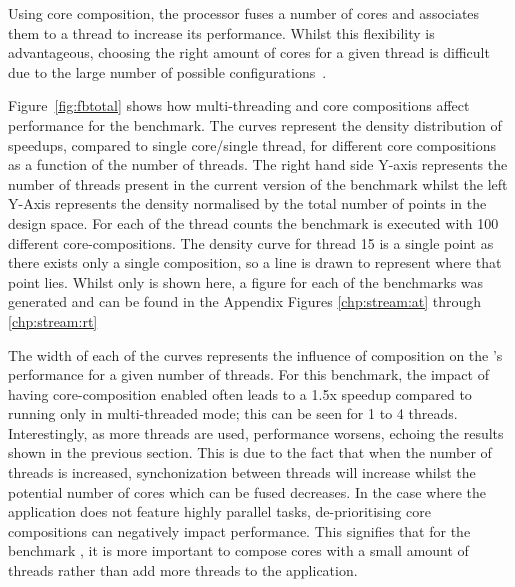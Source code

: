 Using core composition, the processor fuses a number of cores and associates them to a thread to increase its performance.
Whilst this flexibility is advantageous, choosing the right amount of cores for a given thread is difficult due to the large number of possible configurations~\cite{gulati2008multitaskingdmc}.

Figure~\ref{fig:fbtotal} shows how multi-threading and core compositions affect performance for the  benchmark.
The curves represent the density distribution of speedups, compared to single core/single thread, for different core compositions as a function of the number of threads.
The right hand side Y-axis represents the number of threads present in the current version of the benchmark whilst the left Y-Axis represents the density normalised by the total number of points in the design space.
For each of the thread counts the benchmark is executed with 100 different core-compositions.
The density curve for thread 15 is a single point as there exists only a single composition, so a line is drawn to represent where that point lies.
Whilst only  is shown here, a figure for each of the benchmarks was generated and can be found in the Appendix Figures \ref{chp:stream:at} through \ref{chp:stream:rt}

The width of each of the curves represents the influence of composition on the 's performance for a given number of threads.
For this benchmark, the impact of having core-composition enabled often leads to a 1.5x speedup compared to running only in multi-threaded mode; this can be seen for 1 to 4 threads.
Interestingly, as more threads are used, performance worsens, echoing the results shown in the previous section.
This is due to the fact that when the number of threads is increased, synchonization between threads will increase whilst the potential number of cores which can be fused decreases.
In the case where the application does not feature highly parallel tasks, de-prioritising core compositions can negatively impact performance.
This signifies that for the benchmark , it is more important to compose cores with a small amount of threads rather than add more threads to the application.



